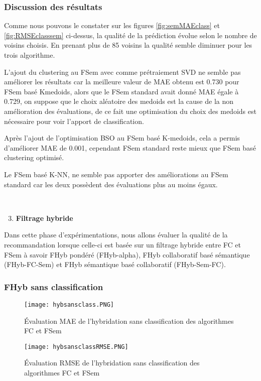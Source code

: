 \subsubsection*{Discussion des résultats}
Comme nous pouvons le constater sur les figures \ref{fig:semMAEclass} et \ref{fig:RMSEclasssem} ci-dessus, la qualité de la prédiction évolue selon le nombre de voisins choisis. En prenant plus de 85 voisins la qualité semble diminuer pour les trois algorithme.

L'ajout du clustering au FSem avec comme prétraiement SVD ne semble pas améliorer les résultats car la meilleure valeur de MAE obtenu est 0.730 pour FSem basé Kmedoids, alors que le FSem standard avait donné MAE égale à 0.729, on suppose que le choix aléatoire des medoids est la cause de la non amélioration des évaluations, de ce fait une optimisation du choix des medoids est nécessaire pour voir l'apport de classification.

Après l'ajout de l'optimisation BSO au FSem basé K-medoids, cela a permis d'améliorer MAE de 0.001, cependant FSem standard reste mieux que FSem basé clustering optimisé.

Le FSem basé K-NN, ne semble pas apporter des améliorations au FSem standard car les deux possèdent des évaluations plus au moins égaux.

\mbox{}\\
\begin{enumerate}[nosep,label=\textbf{\arabic*)}]
	\setcounter{enumi}{2}
	\item \textbf{Filtrage hybride}
\end{enumerate}
\mbox{} \indent Dans cette phase d’expérimentations, nous allons évaluer la qualité de la recommandation lorsque celle-ci est basée sur un filtrage hybride entre FC et FSem à savoir FHyb pondéré (FHyb-alpha), FHyb collaboratif basé sémantique (FHyb-FC-Sem) et FHyb sémantique basé collaboratif (FHyb-Sem-FC).
\subsubsection*{FHyb sans classification}
\begin{figure}[H]
	\centering
	\texttt{[image: hybsansclass.PNG]}
	\caption{Évaluation MAE de l'hybridation sans classification des algorithmes FC et FSem}
	\label{fig:hybsansclassMAE}
\end{figure}

\begin{figure}[H]
	\centering
	\texttt{[image: hybsansclassRMSE.PNG]}
	\caption{Évaluation RMSE de l'hybridation sans classification des algorithmes FC et FSem}
	\label{fig:hybsansclassRMSE}
\end{figure}

